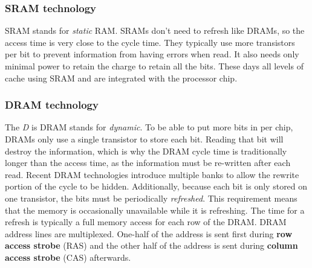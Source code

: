 \documentclass[11pt]{article}
\begin{document}
\subsubsection{SRAM technology}
SRAM stands for \textit{static} RAM. SRAMs don't need to refresh like DRAMs, so the access time is very close to the cycle time. They typically use more transistors per bit to prevent information from having errors when read. It also needs only minimal power to retain the charge to retain all the bits. These days all levels of cache using SRAM and are integrated with the processor chip.

\subsubsection{DRAM technology}
The \textit{D} is DRAM stands for \textit{dynamic}. To be able to put more bits in per chip, DRAMs only use a single transistor to store each bit. Reading that bit will destroy the information, which is why the DRAM cycle time is traditionally longer than the access time, as the information must be re-written after each read. Recent DRAM technologies introduce multiple banks to allow the rewrite portion of the cycle to be hidden. Additionally, because each bit is only stored on one transistor, the bits must be periodically \textit{refreshed}. This requirement means that the memory is occasionally unavailable while it is refreshing. The time for a refresh is typically a full memory access for each row of the DRAM. 
\n
DRAM address lines are multiplexed. One-half of the address is sent first during \textbf{row access strobe} (RAS) and the other half of the address is sent during \textbf{column access strobe} (CAS) afterwards.
\end{document}
